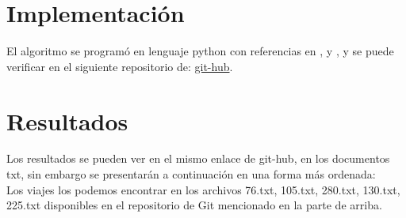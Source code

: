 \documentclass[12pt,a4paper]{article}
\begin{document}
\section{Implementación} 
El algoritmo se programó en lenguaje python con referencias en \cite{van1991guia}, \cite{van2017tutorial} y \cite{chun2001core}, y se puede verificar en el siguiente repositorio de: \href{https://github.com/arnoldae9/PycharmProjects.git}{git-hub}.

\section{Resultados} 
Los resultados se pueden ver en el mismo enlace de git-hub, en los documentos txt, sin embargo se presentarán a continuación en una forma más ordenada:
\\ Los viajes los podemos encontrar en los archivos 76.txt, 105.txt, 280.txt, 130.txt, 225.txt disponibles en el repositorio de Git mencionado en la parte de arriba. 
\begin{table}[h!]
    \centering
    \end{table}
\end{document}
